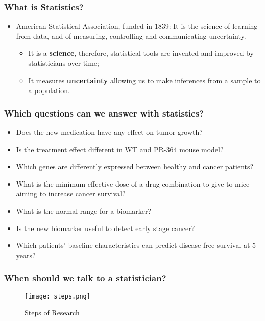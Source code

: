 \documentclass[10pt]{beamer}
\begin{document}
\begin{frame}
\frametitle{What is Statistics?}
\begin{itemize}
\item American Statistical Association, funded in 1839: It is the science of learning from data, and of measuring, controlling and communicating uncertainty.
\begin{itemize}
\item It is a \textbf{science}, therefore, statistical tools are invented and improved by statisticians over time;
\item It measures \textbf{uncertainty} allowing us to make inferences from a sample to a population.
\end{itemize}
\end{itemize}
\end{frame}

\begin{frame}
\frametitle{Which questions can we answer with statistics?}
\begin{itemize}
\item<1-> Does the new medication have any effect on tumor growth?
\item<2-> Is the treatment effect different in WT and PR-364 mouse model?
\item<3-> Which genes are differently expressed between healthy and cancer patients?
\item<4-> What is the minimum effective dose of a drug combination to give to mice aiming to increase cancer survival?
\item<5-> What is the normal range for a biomarker? 
\item<6-> Is the new biomarker useful to detect early stage cancer?
\item<7-> Which patients' baseline characteristics can predict disease free survival at 5 years?
\end{itemize}
\end{frame}

\begin{frame}
\frametitle{When should we talk to a statistician?}
\begin{figure}
	\centering
		\texttt{[image: steps.png]}
	\caption{Steps of Research}
	\label{fig:steps}
\end{figure}
\end{frame}
\end{document}
